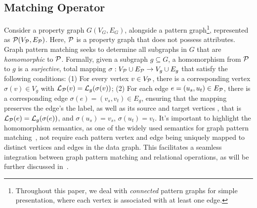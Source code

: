 \subsection{Matching Operator}
\label{sec:graph-relational-algebra}


Consider a property graph \(G(V_G, E_G)\), alongside a pattern graph\footnote{Throughout this paper, we deal with \emph{connected} pattern graphs for simple presentation, where each vertex is associated with at least one edge.}, represented as \(\mathcal{P}(V_{\mathcal{P}}, E_{\mathcal{P}})\). Here, \(\mathcal{P}\) is a property graph that does not possess attributes.
Graph pattern matching seeks to determine all subgraphs in \(G\) that are \emph{homomorphic} to \(\mathcal{P}\).
Formally, given a subgraph $g \subseteq G$, a homomorphism from \(\mathcal{P}\) to \(g\) is a \emph{surjective}, total mapping \(\sigma: V_{\mathcal{P}} \cup E_{\mathcal{P}} \to V_{g} \cup E_{g}\) that satisfy the following conditions: (1) For every vertex \(v \in V_{\mathcal{P}}\), there is a corresponding vertex \(\sigma(v) \in V_{g}\) with \(\mathcal{L}_{\mathcal{P}}(v) = \mathcal{L}_{g}(\sigma(v))\); (2) For each edge \(e = (u_s, u_t) \in E_{\mathcal{P}}\), there is a corresponding edge \(\sigma(e) = (v_s, v_t) \in E_{g}\), ensuring that the mapping preserves the edge's the label, as well as its source and target vertices , that is \(\mathcal{L}_{\mathcal{P}}(e) = \mathcal{L}_g(\sigma(e))\), and \(\sigma(u_s) = v_s\), \(\sigma(u_t) = v_t\). It's important to highlight the homomorphism semantics, as one of the widely used semantics for graph pattern matching~\cite{angles2017foundations},  not require each pattern vertex and edge being uniquely mapped to distinct vertices and edges in the data graph. This facilitates a seamless integration between graph pattern matching and relational operations, as will be further discussed in~.

